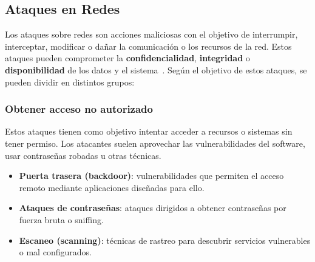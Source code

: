 \subsection{Ataques en Redes}
\label{subsec:Ataques}
Los ataques sobre redes son acciones maliciosas con el objetivo de interrumpir, interceptar, modificar o dañar la comunicación o los recursos de la red. Estos ataques pueden comprometer la \textbf{confidencialidad}, \textbf{integridad} o \textbf{disponibilidad} de los datos y el sistema~\cite{ataques}. Según el objetivo de estos ataques, se pueden dividir en distintos grupos:

\subsubsection{Obtener acceso no autorizado}
\label{subsubsec:accesso_no_autorizado}
Estos ataques tienen como objetivo intentar acceder a recursos o sistemas sin tener permiso. Los atacantes suelen aprovechar las vulnerabilidades del software, usar contraseñas robadas u otras técnicas.
\begin{itemize}
    \item \textbf{Puerta trasera (backdoor)}: vulnerabilidades que permiten el acceso remoto mediante aplicaciones diseñadas para ello.
    \item \textbf{Ataques de contraseñas}: ataques dirigidos a obtener contraseñas por fuerza bruta o sniffing.
    \item \textbf{Escaneo (scanning)}: técnicas de rastreo para descubrir servicios vulnerables o mal configurados.
\end{itemize}


